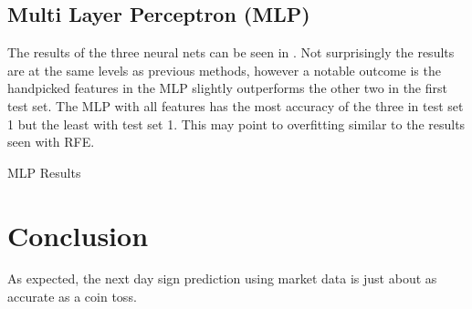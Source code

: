 \documentclass{article}\raggedbottom
\begin{document}
\subsection{Multi Layer Perceptron (MLP)}
The results of the three neural nets can be seen in . Not surprisingly the results are at the same levels as previous methods, however a notable outcome is the handpicked features in the MLP slightly outperforms the other two in the first test set. The MLP with all features has the most accuracy of the three in test set 1 but the least with test set 1. This may point to overfitting similar to the results seen with RFE.

\begin{table}[h]
	\centering
	\caption{MLP Results}
	\label{tab:MLP}
\end{table}
\section{Conclusion}
As expected, the next day sign prediction using market data is just about as accurate as a coin toss.

 

\end{document}
